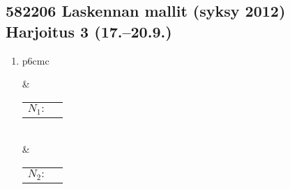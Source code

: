 \documentclass[finnish]{article}
\begin{document}
\subsection*{582206 Laskennan mallit (syksy 2012)\\
{\rm Harjoitus 3 (17.--20.9.)}}

\bigskip 

\begin{enumerate}


\item 
\begin{tabular}[t]{p{6cm}c}

&

\begin{tabular}{cm{4cm}}
$N_1:$ &
\begin{tikzpicture}[->,>=stealth',shorten >=1pt,auto,node distance=2cm,semithick]

 \node[state,initial,accepting] (q0)               {$q_0$};
 \node[state]                   (q1) [right of=q0] {$q_1$};

 \path (q0) edge [loop above]  node      {$a$}   ()
            edge               node     {$a$}  (q1)
       (q1) edge  [loop right]       node       {$b$}  ();
\end{tikzpicture} 
\end{tabular}

\\[2cm]

 & 
\begin{tabular}{cm{4cm}}
$N_2:$ &
\begin{tikzpicture}[->,>=stealth',shorten >=1pt,auto,node distance=2cm,semithick]

 \node[state,initial,accepting]	(q0)               {$q_0$};
 \node[state]   				(q1) [right of=q0] {$q_1$};
 \node[state,accepting]         (q2) [right of=q1] {$q_2$};
 \node[state,accepting]         (q3) [below of=q1] {$q_3$};
 

\end{tikzpicture}
\end{tabular}
\end{tabular}
\end{enumerate}
\end{document}
